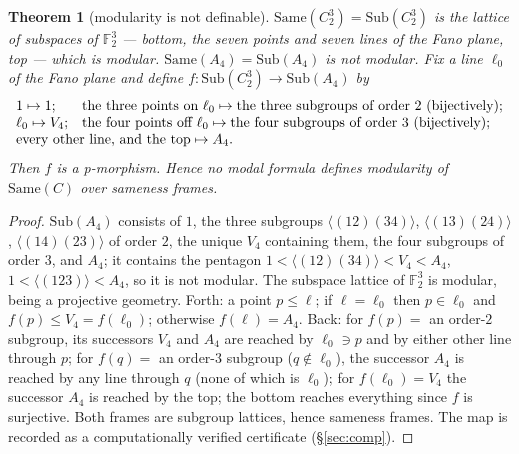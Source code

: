 \documentclass[11pt]{amsart}
\newtheorem{thm}{Theorem}[section]
\theoremstyle{definition}
\newcommand{\Same}{\mathrm{Same}}
\newcommand{\Sub}{\mathrm{Sub}}
\begin{document}
\begin{thm}[modularity is not definable]\label{thm:nondefmod}
$\Same(C_2^3)=\Sub(C_2^3)$ is the lattice of subspaces of $\mathbb F_2^3$ ---
bottom, the seven points and seven lines of the Fano plane, top --- which is
modular. $\Same(A_4)=\Sub(A_4)$ is not modular. Fix a line $\ell_0$ of the Fano
plane and define $f\colon\Sub(C_2^3)\to\Sub(A_4)$ by
\[
\begin{array}{ll}
1\mapsto1; & \text{the three points on }\ell_0\mapsto\text{the three
subgroups of order }2\text{ (bijectively)};\\
\ell_0\mapsto V_4; & \text{the four points off }\ell_0\mapsto\text{the four
subgroups of order }3\text{ (bijectively)};\\
\multicolumn{2}{l}{\text{every other line, and the top}\mapsto A_4.}
\end{array}
\]
Then $f$ is a p-morphism. Hence no modal formula defines modularity of
$\Same(C)$ over sameness frames.
\end{thm}
\begin{proof}
$\Sub(A_4)$ consists of $1$, the three subgroups $\langle(12)(34)\rangle$,
$\langle(13)(24)\rangle$, $\langle(14)(23)\rangle$ of order $2$, the unique
$V_4$ containing them, the four subgroups of order $3$, and $A_4$; it contains
the pentagon $1<\langle(12)(34)\rangle<V_4<A_4$, $1<\langle(123)\rangle<A_4$, so
it is not modular. The subspace lattice of $\mathbb F_2^3$ is
modular, being a projective geometry. Forth: a point $p\le\ell$; if $\ell=\ell_0$
then $p\in\ell_0$ and $f(p)\le V_4=f(\ell_0)$; otherwise $f(\ell)=A_4$. Back: for
$f(p)=$ an order-$2$ subgroup, its successors $V_4$ and $A_4$ are reached by
$\ell_0\ni p$ and by either other line through $p$; for $f(q)=$ an order-$3$
subgroup ($q\notin\ell_0$), the successor $A_4$ is reached by any line through
$q$ (none of which is $\ell_0$); for $f(\ell_0)=V_4$ the successor $A_4$ is
reached by the top; the bottom reaches everything since $f$ is surjective. Both
frames are subgroup lattices, hence sameness frames. The map is recorded as a
computationally verified certificate (\S\ref{sec:comp}).
\end{proof}
\end{document}
